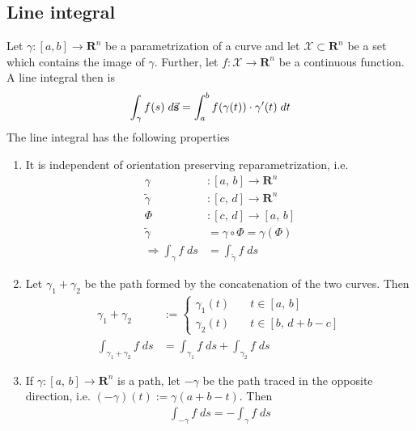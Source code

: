 \documentclass[8pt]{extarticle}
\newcommand{\R}{{\mathbb R}}
\newcommand{\X}{{\mathcal X}}
\newcommand{\ra}{{\rightarrow}}
\newcommand{\Ra}{{\Rightarrow}}
\def\R{\mathbf{R}}
\begin{document}
\begin{multicols*}{3}
  \subsection{Line integral}
  Let $\gamma: [a, b] \ra \R^n$ be a parametrization
  of a curve and let $\X \subset \R^n$ be a set which contains
  the image of $\gamma$. Further, let $f: \X \ra \R^n$ be a continuous
  function. A line integral then is
  \begin{align*}
    \int_\gamma f(s) \; d \vectorarrow{s} = \int_a^b f(\gamma(t)) \cdot \gamma'(t) \; dt
  \end{align*}
  The line integral has the following properties
  \begin{enumerate}[label=(\arabic*)]
    \item It is independent of orientation preserving reparametrization, i.e.
          \begin{align*}
            \gamma                  & : [a,\, b] \ra \R^n                      \\
            \tilde{\gamma}          & : [c,\, d] \ra \R^n                      \\
            \varPhi                 & : [c, \, d] \ra [a, \, b]                \\
            \tilde{\gamma}          & = \gamma \circ \varPhi = \gamma(\varPhi) \\
            \Ra \int_\gamma f \; ds & = \int_{\tilde{\gamma}} f \; ds
          \end{align*}
    \item Let $\gamma_1 + \gamma_2$ be the path formed
          by the concatenation of the two curves. Then
          \begin{align*}
            \gamma_1 + \gamma_2                & :=
            \begin{cases}
              \gamma_1(t) \quad & t \in [a, \, b]         \\
              \gamma_2(t) \quad & t \in [b, \, d + b - c]
            \end{cases}                                                              \\
            \int_{\gamma_1 + \gamma_2} f \; ds & = \int_{\gamma_1} f \; ds + \int_{\gamma_2} f\; ds
          \end{align*}
    \item If $\gamma: [a, \, b] \ra \R^n$ is a path, let $-\gamma$
          be the path traced in the opposite direction, i.e.
          $(-\gamma)(t) := \gamma(a + b - t)$. Then
          \begin{align*}
            \int_{-\gamma} f \; ds = - \int_\gamma f \; ds
          \end{align*}
  \end{enumerate}

\end{multicols*}
\end{document}
